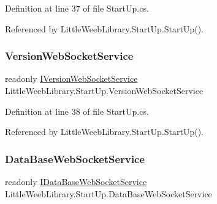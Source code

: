 Definition at line 37 of file Start\+Up.\+cs.



Referenced by Little\+Weeb\+Library.\+Start\+Up.\+Start\+Up().

\mbox{\label{class_little_weeb_library_1_1_start_up_ae03e11c4c9b89a1592dea78426186a10}} 
\subsubsection{\texorpdfstring{Version\+Web\+Socket\+Service}{VersionWebSocketService}}
{\footnotesize\ttfamily readonly \mbox{\hyperlink{interface_little_weeb_library_1_1_services_1_1_i_version_web_socket_service}{I\+Version\+Web\+Socket\+Service}} Little\+Weeb\+Library.\+Start\+Up.\+Version\+Web\+Socket\+Service\hspace{0.3cm}{\ttfamily [private]}}



Definition at line 38 of file Start\+Up.\+cs.



Referenced by Little\+Weeb\+Library.\+Start\+Up.\+Start\+Up().

\mbox{\label{class_little_weeb_library_1_1_start_up_aa330ff3b4b2a2d501b127f99cfaddc12}} 
\subsubsection{\texorpdfstring{Data\+Base\+Web\+Socket\+Service}{DataBaseWebSocketService}}
{\footnotesize\ttfamily readonly \mbox{\hyperlink{interface_little_weeb_library_1_1_services_1_1_i_data_base_web_socket_service}{I\+Data\+Base\+Web\+Socket\+Service}} Little\+Weeb\+Library.\+Start\+Up.\+Data\+Base\+Web\+Socket\+Service\hspace{0.3cm}{\ttfamily [private]}}



